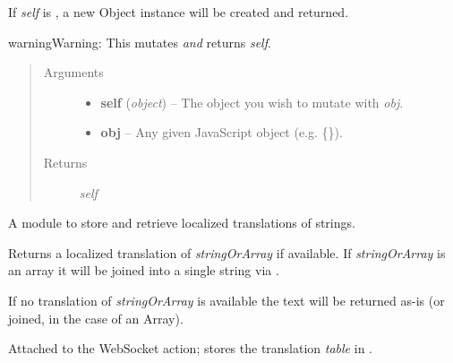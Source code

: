 \documentclass[letterpaper,10pt,openany]{sphinxmanual}
\begin{document}
\begin{fulllineitems}
\begin{fulllineitems}
\begin{fulllineitems}
If \emph{self} is , a new Object instance will be created and returned.

\begin{notice}{warning}{Warning:}
This mutates \emph{and} returns \emph{self}.
\end{notice}
\begin{quote}\begin{description}
\item[{Arguments}] \leavevmode\begin{itemize}
\item {} 
\textbf{self} (\emph{object}) -- The object you wish to mutate with \emph{obj}.

\item {} 
\textbf{obj} -- Any given JavaScript object (e.g. \{\}).

\end{itemize}

\item[{Returns}] \leavevmode
\emph{self}

\end{description}\end{quote}

\end{fulllineitems}


\end{fulllineitems}



\begin{fulllineitems}
\label{Developer/js_gateone:GateOne.i18n}
A module to store and retrieve localized translations of strings.


\begin{fulllineitems}
\label{Developer/js_gateone:GateOne.i18n.gettext}
Returns a localized translation of \emph{stringOrArray} if available.  If \emph{stringOrArray} is an array it will be joined into a single string via .

If no translation of \emph{stringOrArray} is available the text will be returned as-is (or joined, in the case of an Array).

\end{fulllineitems}



\begin{fulllineitems}
\label{Developer/js_gateone:GateOne.i18n.registerTranslationAction}
Attached to the  WebSocket action; stores the translation \emph{table} in .


\end{fulllineitems}
\end{fulllineitems}
\end{fulllineitems}
\end{document}
